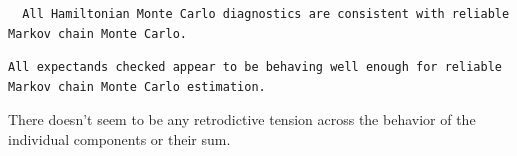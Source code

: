 \documentclass[
  letterpaper,
  DIV=11,
  numbers=noendperiod]{scrartcl}
\newenvironment{Shaded}{\begin{snugshade}}{\end{snugshade}}
\newcommand{\AttributeTok}[1]{\textcolor[rgb]{0.40,0.45,0.13}{#1}}
\newcommand{\ConstantTok}[1]{\textcolor[rgb]{0.56,0.35,0.01}{#1}}
\newcommand{\FunctionTok}[1]{\textcolor[rgb]{0.28,0.35,0.67}{#1}}
\newcommand{\NormalTok}[1]{\textcolor[rgb]{0.00,0.23,0.31}{#1}}
\newcommand{\OtherTok}[1]{\textcolor[rgb]{0.00,0.23,0.31}{#1}}
\newcommand{\SpecialCharTok}[1]{\textcolor[rgb]{0.37,0.37,0.37}{#1}}
\newcommand{\StringTok}[1]{\textcolor[rgb]{0.13,0.47,0.30}{#1}}
\begin{document}
\begin{verbatim}
  All Hamiltonian Monte Carlo diagnostics are consistent with reliable
Markov chain Monte Carlo.
\end{verbatim}

\begin{Shaded}
\end{Shaded}

\begin{verbatim}
All expectands checked appear to be behaving well enough for reliable
Markov chain Monte Carlo estimation.
\end{verbatim}

There doesn't seem to be any retrodictive tension across the behavior of
the individual components or their sum.
\end{document}
